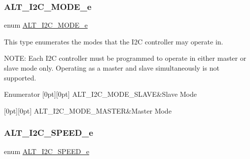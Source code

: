 \subsubsection{\texorpdfstring{ALT\_I2C\_MODE\_e}{ALT\_I2C\_MODE\_e}}
{\footnotesize\ttfamily enum \mbox{\hyperlink{group__ALT__I2C_gacf173458ee847bebf75871c319aab2af}{A\+L\+T\+\_\+\+I2\+C\+\_\+\+M\+O\+D\+E\+\_\+e}}}

This type enumerates the modes that the I2C controller may operate in.

N\+O\+TE\+: Each I2C controller must be programmed to operate in either master or slave mode only. Operating as a master and slave simultaneously is not supported. \begin{DoxyEnumFields}{Enumerator}
[0pt][0pt]{}\mbox{\label{group__ALT__I2C_ggacf173458ee847bebf75871c319aab2afaa18ebb4c48e771eb6d6903223d308fa4}} 
A\+L\+T\+\_\+\+I2\+C\+\_\+\+M\+O\+D\+E\+\_\+\+S\+L\+A\+VE&Slave Mode \\
\hline

[0pt][0pt]{}\mbox{\label{group__ALT__I2C_ggacf173458ee847bebf75871c319aab2afae4ef988cfcd5b3e534395b11ad7b58cd}} 
A\+L\+T\+\_\+\+I2\+C\+\_\+\+M\+O\+D\+E\+\_\+\+M\+A\+S\+T\+ER&Master Mode \\
\hline

\end{DoxyEnumFields}
\mbox{\label{group__ALT__I2C_gad65b1b276561735ec5613ae1b1a000b7}} 
\subsubsection{\texorpdfstring{ALT\_I2C\_SPEED\_e}{ALT\_I2C\_SPEED\_e}}
{\footnotesize\ttfamily enum \mbox{\hyperlink{group__ALT__I2C_gad65b1b276561735ec5613ae1b1a000b7}{A\+L\+T\+\_\+\+I2\+C\+\_\+\+S\+P\+E\+E\+D\+\_\+e}}}

